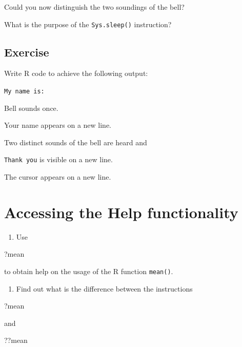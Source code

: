 \documentclass[
]{book}
\newenvironment{Shaded}{\begin{snugshade}}{\end{snugshade}}
\newcommand{\NormalTok}[1]{#1}
\providecommand{\tightlist}{%
  \setlength{\itemsep}{0pt}\setlength{\parskip}{0pt}}
\begin{document}
Could you now distinguish the two soundings of the bell?

What is the purpose of the \texttt{Sys.sleep()} instruction?

\subsection{Exercise}\label{exercise-1}

Write R code to achieve the following output:

\texttt{My\ name\ is:}

Bell sounds once.

Your name appears on a new line.

Two distinct sounds of the bell are heard and

\texttt{Thank\ you} is visible on a new line.

The cursor appears on a new line.

\section{Accessing the Help functionality}\label{accessing-the-help-functionality}

\begin{enumerate}
\def\labelenumi{(\alph{enumi})}
\tightlist
\item
  Use
\end{enumerate}

\begin{Shaded}
\begin{Highlighting}[]
\NormalTok{?mean}
\end{Highlighting}
\end{Shaded}

to obtain help on the usage of the R function \texttt{mean()}.

\begin{enumerate}
\def\labelenumi{(\alph{enumi})}
\setcounter{enumi}{1}
\tightlist
\item
  Find out what is the difference between the instructions
\end{enumerate}

\begin{Shaded}
\begin{Highlighting}[]
\NormalTok{?mean}
\end{Highlighting}
\end{Shaded}

and

\begin{Shaded}
\begin{Highlighting}[]
\NormalTok{??mean}
\end{Highlighting}
\end{Shaded}
\end{document}
